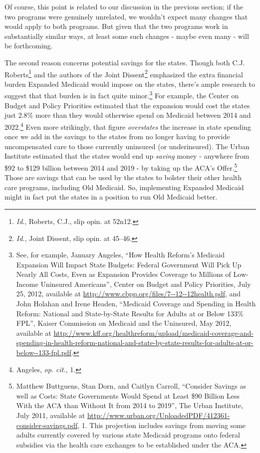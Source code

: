 \documentclass[
  10pt,
  letterpaper,
  DIV=11,
  numbers=noendperiod,
  twoside]{scrartcl}
\begin{document}
Of course, this point is related to our discussion in the previous
section; if the two programs were genuinely unrelated, we wouldn't
expect many changes that would apply to both programs. But given that
the two programs work in substantially similar ways, at least some such
changes - maybe even many - will be forthcoming.

The second reason concerns potential savings for the states. Though both
C.J. Roberts\footnote{\emph{Id}., Roberts, C.J., slip opin. at 52n12.}
and the authors of the Joint Dissent\footnote{\emph{Id.}, Joint Dissent,
  slip opin. at 45--46.} emphasized the extra financial burden Expanded
Medicaid would impose on the states, there's ample research to suggest
that that burden is in fact quite minor.\footnote{See, for example,
  January Angeles, ``How Health Reform's Medicaid Expansion Will Impact
  State Budgets: Federal Government Will Pick Up Nearly All Costs, Even
  as Expansion Provides Coverage to Millions of Low-Income Uninsured
  Americans'', Center on Budget and Policy Priorities, July 25, 2012,
  available at \url{http://www.cbpp.org/files/7--12--12health.pdf}, and
  John Holahan and Irene Headen, ``Medicaid Coverage and Spending in
  Health Reform: National and State-by-State Results for Adults at or
  Below 133\% FPL'', Kaiser Commission on Medicaid and the Uninsured,
  May 2012, available at
  \url{http://www.kff.org/healthreform/upload/medicaid-coverage-and-spending-in-health-reform-national-and-state-by-state-results-for-adults-at-or-below--133-fpl.pdf}.}
For example, the Center on Budget and Policy Priorities estimated that
the expansion would cost the states just 2.8\% more than they would
otherwise spend on Medicaid between 2014 and 2022.\footnote{Angeles,
  \emph{op. cit.}, 1.} Even more strikingly, that figure
\emph{overstates} the increase in state spending once we add in the
savings to the states from no longer having to provide uncompensated
care to those currently uninsured (or underinsured). The Urban Institute
estimated that the states would end up \emph{saving} money - anywhere
from \$92 to \$129 billion between 2014 and 2019 - by taking up the
ACA's Offer.\footnote{Matthew Buttguens, Stan Dorn, and Caitlyn Carroll,
  ``Consider Savings as well as Costs: State Governments Would Spend at
  Least \$90 Billion Less With the ACA than Without It from 2014 to
  2019'', The Urban Institute, July 2011, available at
  \url{http://www.urban.org/UploadedPDF/412361-consider-savings.pdf}, 1.
  This projection includes savings from moving some adults currently
  covered by various state Medicaid programs onto federal subsidies via
  the health care exchanges to be established under the ACA.} Those are
savings that can be used by the states to bolster their other health
care programs, including Old Medicaid. So, implementing Expanded
Medicaid might in fact put the states in a position to run Old Medicaid
better.
\end{document}
